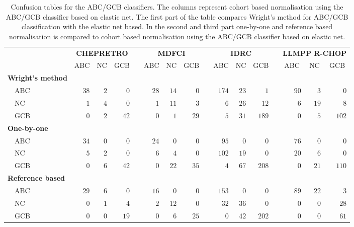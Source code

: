 \begin{table}[!tbp]
{\footnotesize
\caption{Confusion tables for the ABC/GCB classifiers.
The columns represent cohort based normalisation using the ABC/GCB classifier
based on elastic net.
The first part of the table compares Wright's method for ABC/GCB classification
with the elastic net based.
In the second and third part one-by-one and reference based normalisation is
compared to cohort based normalisation using the ABC/GCB classifier based on
elastic net.\label{tab:confusionABCGCBHEMA}} 
\begin{center}
\begin{tabular}{lrrrcrrrcrrrcrrr}
\hline\hline
\multicolumn{1}{l}{\bfseries }&\multicolumn{3}{c}{\bfseries CHEPRETRO}&\multicolumn{1}{c}{\bfseries }&\multicolumn{3}{c}{\bfseries MDFCI}&\multicolumn{1}{c}{\bfseries }&\multicolumn{3}{c}{\bfseries IDRC}&\multicolumn{1}{c}{\bfseries }&\multicolumn{3}{c}{\bfseries LLMPP R-CHOP}\tabularnewline
\cline{2-4} \cline{6-8} \cline{10-12} \cline{14-16}
\multicolumn{1}{l}{}&\multicolumn{1}{c}{ABC}&\multicolumn{1}{c}{NC}&\multicolumn{1}{c}{GCB}&\multicolumn{1}{c}{}&\multicolumn{1}{c}{ABC}&\multicolumn{1}{c}{NC}&\multicolumn{1}{c}{GCB}&\multicolumn{1}{c}{}&\multicolumn{1}{c}{ABC}&\multicolumn{1}{c}{NC}&\multicolumn{1}{c}{GCB}&\multicolumn{1}{c}{}&\multicolumn{1}{c}{ABC}&\multicolumn{1}{c}{NC}&\multicolumn{1}{c}{GCB}\tabularnewline
\hline
{\bfseries Wright's method}&&&&&&&&&&&&&&&\tabularnewline
~~ABC&$38$&$2$&$ 0$&&$28$&$14$&$ 0$&&$174$&$23$&$  1$&&$90$&$ 3$&$  0$\tabularnewline
~~NC&$ 1$&$4$&$ 0$&&$ 1$&$11$&$ 3$&&$  6$&$26$&$ 12$&&$ 6$&$19$&$  8$\tabularnewline
~~GCB&$ 0$&$2$&$42$&&$ 0$&$ 1$&$29$&&$  5$&$31$&$189$&&$ 0$&$ 5$&$102$\tabularnewline
\hline
{\bfseries One-by-one}&&&&&&&&&&&&&&&\tabularnewline
~~ABC&$34$&$0$&$ 0$&&$24$&$ 0$&$ 0$&&$ 95$&$ 0$&$  0$&&$76$&$ 0$&$  0$\tabularnewline
~~NC&$ 5$&$2$&$ 0$&&$ 6$&$ 4$&$ 0$&&$102$&$19$&$  0$&&$20$&$ 6$&$  0$\tabularnewline
~~GCB&$ 0$&$6$&$42$&&$ 0$&$22$&$35$&&$  4$&$67$&$208$&&$ 0$&$21$&$110$\tabularnewline
\hline
{\bfseries Reference based}&&&&&&&&&&&&&&&\tabularnewline
~~ABC&$29$&$6$&$ 0$&&$16$&$ 0$&$ 0$&&$153$&$ 0$&$  0$&&$89$&$22$&$  3$\tabularnewline
~~NC&$ 0$&$1$&$ 4$&&$ 2$&$12$&$ 0$&&$ 32$&$36$&$  0$&&$ 0$&$ 0$&$ 28$\tabularnewline
~~GCB&$ 0$&$0$&$19$&&$ 0$&$ 6$&$25$&&$  0$&$42$&$202$&&$ 0$&$ 0$&$ 61$\tabularnewline
\hline
\end{tabular}\end{center}}

\end{table}
